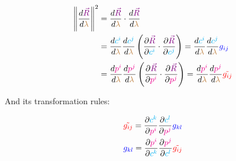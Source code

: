 \begin{align*}
    \norm{\frac{d\begingroup\color{violet}\vec{R}\endgroup}{d\begingroup\color{brown}\lambda\endgroup}}^2 &=
    \frac{d\begingroup\color{violet}\vec{R}\endgroup}{d\begingroup\color{brown}\lambda\endgroup} \cdot \frac{d\begingroup\color{violet}\vec{R}\endgroup}{d\begingroup\color{brown}\lambda\endgroup}\\
    &= \frac{d \begingroup\color{cyan}c^i\endgroup}{d \begingroup\color{brown}\lambda\endgroup}\frac{d \begingroup\color{cyan}c^j\endgroup}{d \begingroup\color{brown}\lambda\endgroup}
    \left(\frac{\partial \begingroup\color{violet}\vec{R}\endgroup}{\partial \begingroup\color{cyan}c^i\endgroup} \cdot \frac{\partial \begingroup\color{violet}\vec{R}\endgroup}{\partial \begingroup\color{cyan}c^j\endgroup}\right) = \frac{d \begingroup\color{cyan}c^i\endgroup}{d \begingroup\color{brown}\lambda\endgroup}\frac{d \begingroup\color{cyan}c^j\endgroup}{d \begingroup\color{brown}\lambda\endgroup} \begingroup\color{blue}g_{ij}\endgroup\\
    &= \frac{d \begingroup\color{magenta}p^i\endgroup}{d \begingroup\color{brown}\lambda\endgroup}\frac{d \begingroup\color{magenta}p^j\endgroup}{d \begingroup\color{brown}\lambda\endgroup}
    \left(\frac{\partial \begingroup\color{violet}\vec{R}\endgroup}{\partial \begingroup\color{magenta}p^i\endgroup} \cdot \frac{\partial \begingroup\color{violet}\vec{R}\endgroup}{\partial \begingroup\color{magenta}p^j\endgroup}\right) = \frac{d \begingroup\color{magenta}p^i\endgroup}{d \begingroup\color{brown}\lambda\endgroup}\frac{d \begingroup\color{magenta}p^j\endgroup}{d \begingroup\color{brown}\lambda\endgroup} \begingroup\color{red}\tilde{g_{ij}}\endgroup
\end{align*}

And its transformation rules:

\begin{align*}
    \begingroup\color{red}\tilde{g_{ij}}\endgroup = \frac{\partial \begingroup\color{cyan}c^k\endgroup}{\partial \begingroup\color{magenta}p^i\endgroup} \frac{\partial \begingroup\color{cyan}c^l\endgroup}{\partial \begingroup\color{magenta}p^j\endgroup} \begingroup\color{blue}g_{kl}\endgroup \\
    \begingroup\color{blue}g_{kl}\endgroup = \frac{\partial \begingroup\color{magenta}p^i\endgroup}{\partial \begingroup\color{cyan}c^k\endgroup} \frac{\partial \begingroup\color{magenta}p^j\endgroup}{\partial \begingroup\color{cyan}c^l\endgroup} \begingroup\color{red}\tilde{g_{ij}}\endgroup
\end{align*}

